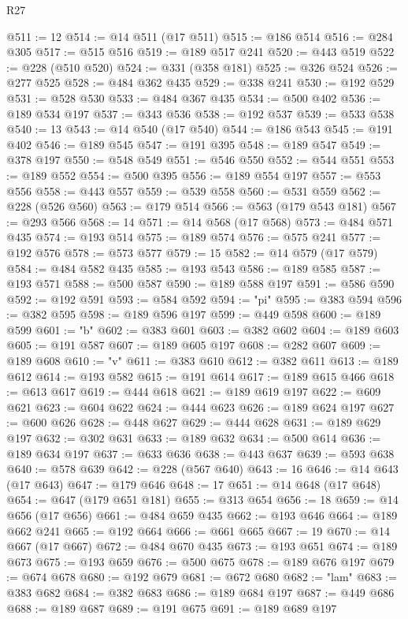 \begin{lexlean}{R27}
\begin{coremodule}
@511 := 12
@514 := @14 @511 (@17 @511)
@515 := @186 @514
@516 := @284 @305
@517 := @515 @516
@519 := @189 @517 @241
@520 := @443 @519
@522 := @228 (@510 @520)
@524 := @331 (@358 @181)
@525 := @326 @524
@526 := @277 @525
@528 := @484 @362 @435
@529 := @338 @241
@530 := @192 @529
@531 := @528 @530
@533 := @484 @367 @435
@534 := @500 @402
@536 := @189 @534 @197
@537 := @343 @536
@538 := @192 @537
@539 := @533 @538
@540 := 13
@543 := @14 @540 (@17 @540)
@544 := @186 @543
@545 := @191 @402
@546 := @189 @545
@547 := @191 @395
@548 := @189 @547
@549 := @378 @197
@550 := @548 @549
@551 := @546 @550
@552 := @544 @551
@553 := @189 @552
@554 := @500 @395
@556 := @189 @554 @197
@557 := @553 @556
@558 := @443 @557
@559 := @539 @558
@560 := @531 @559
@562 := @228 (@526 @560)
@563 := @179 @514
@566 := @563 (@179 @543 @181)
@567 := @293 @566
@568 := 14
@571 := @14 @568 (@17 @568)
@573 := @484 @571 @435
@574 := @193 @514
@575 := @189 @574
@576 := @575 @241
@577 := @192 @576
@578 := @573 @577
@579 := 15
@582 := @14 @579 (@17 @579)
@584 := @484 @582 @435
@585 := @193 @543
@586 := @189 @585
@587 := @193 @571
@588 := @500 @587
@590 := @189 @588 @197
@591 := @586 @590
@592 := @192 @591
@593 := @584 @592
@594 := "pi"
@595 := @383 @594
@596 := @382 @595
@598 := @189 @596 @197
@599 := @449 @598
@600 := @189 @599
@601 := "b"
@602 := @383 @601
@603 := @382 @602
@604 := @189 @603
@605 := @191 @587
@607 := @189 @605 @197
@608 := @282 @607
@609 := @189 @608
@610 := "v"
@611 := @383 @610
@612 := @382 @611
@613 := @189 @612
@614 := @193 @582
@615 := @191 @614
@617 := @189 @615 @466
@618 := @613 @617
@619 := @444 @618
@621 := @189 @619 @197
@622 := @609 @621
@623 := @604 @622
@624 := @444 @623
@626 := @189 @624 @197
@627 := @600 @626
@628 := @448 @627
@629 := @444 @628
@631 := @189 @629 @197
@632 := @302 @631
@633 := @189 @632
@634 := @500 @614
@636 := @189 @634 @197
@637 := @633 @636
@638 := @443 @637
@639 := @593 @638
@640 := @578 @639
@642 := @228 (@567 @640)
@643 := 16
@646 := @14 @643 (@17 @643)
@647 := @179 @646
@648 := 17
@651 := @14 @648 (@17 @648)
@654 := @647 (@179 @651 @181)
@655 := @313 @654
@656 := 18
@659 := @14 @656 (@17 @656)
@661 := @484 @659 @435
@662 := @193 @646
@664 := @189 @662 @241
@665 := @192 @664
@666 := @661 @665
@667 := 19
@670 := @14 @667 (@17 @667)
@672 := @484 @670 @435
@673 := @193 @651
@674 := @189 @673
@675 := @193 @659
@676 := @500 @675
@678 := @189 @676 @197
@679 := @674 @678
@680 := @192 @679
@681 := @672 @680
@682 := "lam"
@683 := @383 @682
@684 := @382 @683
@686 := @189 @684 @197
@687 := @449 @686
@688 := @189 @687
@689 := @191 @675
@691 := @189 @689 @197

\end{coremodule}
\end{lexlean}
